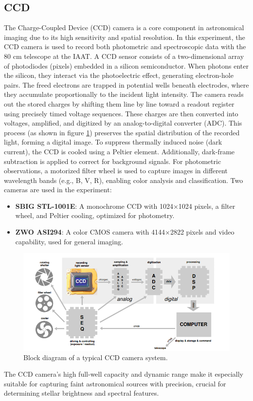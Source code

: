 \documentclass[12pt,a4paper]{article}
\begin{document}
  \subsection{CCD} 
  The Charge-Coupled Device (CCD) camera is a core component in astronomical imaging due to its high sensitivity and spatial resolution. In this experiment, the CCD camera is used to record both photometric and spectroscopic data with the 80 cm telescope at the IAAT.
  A CCD sensor consists of a two-dimensional array of photodiodes (pixels) embedded in a silicon semiconductor. When photons enter the silicon, they interact via the photoelectric effect, generating electron-hole pairs. The freed electrons are trapped in potential wells beneath electrodes, where they accumulate proportionally to the incident light intensity.
  The camera reads out the stored charges by shifting them line by line toward a readout register using precisely timed voltage sequences. These charges are then converted into voltages, amplified, and digitized by an analog-to-digital converter (ADC). This process (as shown in figure \ref{fig:CCD_block}) preserves the spatial distribution of the recorded light, forming a digital image.
  To suppress thermally induced noise (dark current), the CCD is cooled using a Peltier element. Additionally, dark-frame subtraction is applied to correct for background signals. For photometric observations, a motorized filter wheel is used to capture images in different wavelength bands (e.g., B, V, R), enabling color analysis and classification.
  Two cameras are used in the experiment:
  \begin{itemize}
    \item \textbf{SBIG STL-1001E}: A monochrome CCD with 1024×1024 pixels, a filter wheel, and Peltier cooling, optimized for photometry.
    \item \textbf{ZWO ASI294}: A color CMOS camera with 4144×2822 pixels and video capability, used for general imaging.
  \end{itemize}
  \begin{figure}[H]
    \centering
    \includegraphics[width=1.0\textwidth]{Pictures/CCD.png}
    \caption{Block diagram of a typical CCD camera system.}
    \label{fig:CCD_block}
  \end{figure}
  The CCD camera's high full-well capacity and dynamic range make it especially suitable for capturing faint astronomical sources with precision, crucial for determining stellar brightness and spectral features.
 
\end{document}
